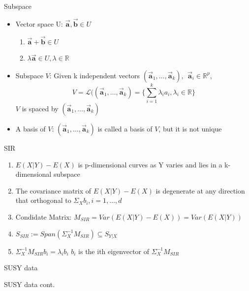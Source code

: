\documentclass[ignorenonframetext,]{beamer}
\providecommand{\tightlist}{%
  \setlength{\itemsep}{0pt}\setlength{\parskip}{0pt}}
\begin{document}
\begin{frame}{Subspace}

\begin{itemize}
\item
  Vector space U: \(\vec{\mathbf{a}}, \vec{\mathbf{b}} \in U\)

  \begin{enumerate}
  \def\labelenumi{\arabic{enumi}.}
  \tightlist
  \item
    \(\vec{\mathbf{a}} + \vec{\mathbf{b}} \in U\)\\
  \item
    \(\lambda \vec{\mathbf{a}} \in U, \lambda \in \mathbb{R}\)
  \end{enumerate}
\item
  Subspace \(V\): Given k independent vectors
  \((\vec{\mathbf{a}}_1, \dots, \vec{\mathbf{a}}_k), ~~\vec{\mathbf{a}}_i \in \mathbb{R}^p\),
  \[
  V = \mathcal{L}((\vec{\mathbf{a}}_1, \dots, \vec{\mathbf{a}}_k) = \{\sum_{i = 1}^k\lambda_ia_i, \lambda_i\in \mathbb{R}\}
  \] \(V\) is spaced by
  \((\vec{\mathbf{a}}_1, \dots, \vec{\mathbf{a}}_k)\)
\item
  A basis of \(V\): \((\vec{\mathbf{a}}_1, \dots, \vec{\mathbf{a}}_k)\)
  is called a basis of \(V\), but it is not unique
\end{itemize}

\end{frame}

\begin{frame}{SIR}

\begin{enumerate}
\def\labelenumi{\arabic{enumi}.}
\tightlist
\item
  \(E(X|Y) - E(X)\) is p-dimensional curves as Y varies and lies in a
  k-dimensional subspace
\item
  The covariance matrix of \(E(X|Y) - E(X)\) is degenerate at any
  direction that orthogonal to \(\Sigma_{X}b_i,i = 1, \dots, d\)
\item
  Condidate Matrix: \(M_{SIR} = Var(E(X|Y) - E(X)) = Var(E(X|Y))\)
\item
  \(S_{SIR} := Span(\Sigma_{X}^{-1}M_{SIR}) \subseteq S_{Y|X}\)
\item
  \(\Sigma_{X}^{-1}M_{SIR}b_i = \lambda_i b_i\) \(b_i\) is the ith
  eigenvector of \(\Sigma_{X}^{-1}M_{SIR}\)
\end{enumerate}

\end{frame}

\begin{frame}{SUSY data}

\end{frame}

\begin{frame}{SUSY data cont.}

\end{frame}
\end{document}
